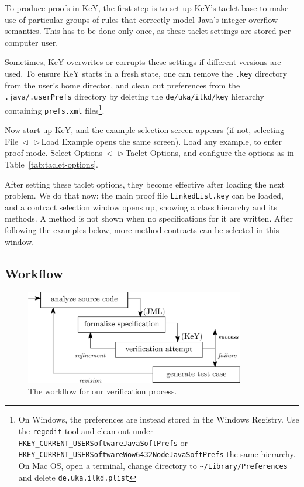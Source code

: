 \documentclass[runningheads]{llncs}
\makeatletter
\DeclareRobustCommand*{\lyxarrow}{%
\@ifstar
{\leavevmode\,$\triangleleft$\,\allowbreak}
{\leavevmode\,$\triangleright$\,\allowbreak}}
\def\bs{\char092}
\makeatother
\begin{document}
To produce proofs in KeY, the first step is to set-up KeY's taclet base to make use of particular groups of rules that correctly model Java's integer overflow semantics. This has to be done only once, as these taclet settings are stored per computer user.

Sometimes, KeY overwrites or corrupts these settings if different versions are used. To ensure KeY starts in a fresh state, one can remove the \texttt{.key} directory from the user's home director, and clean out preferences from the \texttt{.java/.userPrefs} directory by deleting the \texttt{de/uka/ilkd/key} hierarchy containing \texttt{prefs.xml} files\footnote{On Windows, the preferences are instead stored in the Windows Registry. Use the \texttt{regedit} tool and clean out under \texttt{HKEY\_CURRENT\_USER\bs Software\bs JavaSoft\bs Prefs} or \texttt{HKEY\_CURRENT\_USER\bs Software\bs Wow6432Node\bs JavaSoft\bs Prefs} the same hierarchy. On Mac OS, open a terminal, change directory to \texttt{\textasciitilde/Library/Preferences} and delete \texttt{de.uka.ilkd.plist}}.

Now start up KeY, and the example selection screen appears (if not, selecting File\lyxarrow Load Example opens the same screen). Load any example, to enter proof mode. Select Options\lyxarrow Taclet Options, and configure the options as in Table~\ref{tab:taclet-options}.

After setting these taclet options, they become effective after loading the next problem. We do that now: the main proof file \texttt{LinkedList.key} can be loaded, and a contract selection window opens up, showing a class hierarchy and its methods. A method is not shown when no specifications for it are written. After following the examples below, more method contracts can be selected in this window.

\subsection{Workflow}

\begin{figure}
    \centering
    \includegraphics[width=272pt]{figures/workflow.eps}
    \caption{The workflow for our verification process.}
    \label{fig:workflow}
\end{figure}
\end{document}
